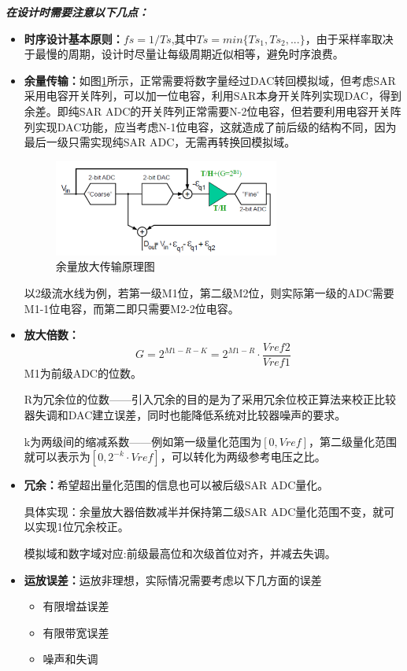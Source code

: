 \documentclass[cs4size,a4paper]{ctexart}
\numberwithin{equation}{section}
\numberwithin{table}{section}
\numberwithin{figure}{section}
\begin{document}
        \textbf{\textit{在设计时需要注意以下几点：}}
        \begin{itemize}
			\item \textbf{时序设计基本原则：}$fs=1/Ts$,其中$Ts = min\{Ts_1,Ts_2,...\}$，由于采样率取决于最慢的周期，设计时尽量让每级周期近似相等，避免时序浪费。
			\item \textbf{余量传输：}如图\ref{fig:circuit2}所示，正常需要将数字量经过DAC转回模拟域，但考虑SAR采用电容开关阵列，可以加一位电容，利用SAR本身开关阵列实现DAC，得到余差。即纯SAR ADC的开关阵列正常需要N-2位电容，但若要利用电容开关阵列实现DAC功能，应当考虑N-1位电容，这就造成了前后级的结构不同，因为最后一级只需实现纯SAR ADC，无需再转换回模拟域。
				\begin{figure}[H]
					\centering
					\includegraphics[width=0.7\textwidth]{figure/circuit2.jpg}
					\caption{余量放大传输原理图} \label{fig:circuit2}
				\end{figure}
			以2级流水线为例，若第一级M1位，第二级M2位，则实际第一级的ADC需要M1-1位电容，而第二即只需要M2-2位电容。
			\item \textbf{放大倍数：}
				\begin{equation}
					G=2^{M1-R-K}=2^{M1-R}\cdot\frac{Vref2}{Vref1}
				\end{equation}
			M1为前级ADC的位数。
			
			R为冗余位的位数——引入冗余的目的是为了采用冗余位校正算法来校正比较器失调和DAC建立误差，同时也能降低系统对比较器噪声的要求。
			
			k为两级间的缩减系数——例如第一级量化范围为$[0,Vref]$，第二级量化范围就可以表示为$[0,2^{-k} \cdot Vref]$，可以转化为两级参考电压之比。
			
			\item \textbf{冗余：}希望超出量化范围的信息也可以被后级SAR ADC量化。
			
			具体实现：余量放大器倍数减半并保持第二级SAR ADC量化范围不变，就可以实现1位冗余校正。
			
			模拟域和数字域对应:前级最高位和次级首位对齐，并减去失调。
			
			\item \textbf{运放误差：}运放非理想，实际情况需要考虑以下几方面的误差
				\begin{itemize}
					\item 有限增益误差
					\item 有限带宽误差
					\item 噪声和失调
				\end{itemize}
			
        \end{itemize}
\end{document}
